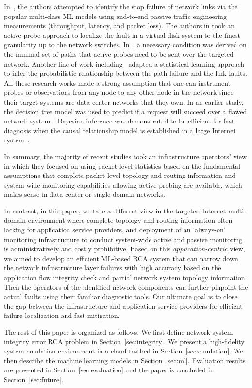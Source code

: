 In~\cite{Link-JIoT-2019}, the authors attempted to identify the stop failure of network links via the popular multi-class ML models using end-to-end passive traffic engineering measurements (throughput, latency, and packet loss). The authors in \cite{DeepView:NSDI18} took an active probe approach to localize the fault in a virtual disk system to the finest granularity up to the network switches. In~\cite{netbouncer:nsdi18}, a necessary condition was derived on the minimal set of paths that active probes need to be sent over the targeted network. Another line of work including~\cite{NetPoirot:Sigcomm2016,KDD14} adapted a statistical learning approach to infer the probabilistic relationship between the path failure and the link faults. All these research works made a strong assumption that one can instrument probes or observations from any node to any other node in the network since their target systems are data center networks that they own. In an earlier study, the decision tree model was used to predict if a request will succeed over a flawed network system~\cite{DT:2004}. Bayesian inference was demonstrated to be efficient for fast diagnosis when the causal relationship model is established in a large Internet system~\cite{BN-Internet:2007}.

In summary, the majority of recent studies took an infrastructure operators' view in which they focused on using packet-level statistics based on the fundamental assumptions that complete packet level topology and routing information 
and system-wide monitoring capabilities allowing active probing are available, which makes sense in data center or single domain networks.  

In contrast, in this paper, we take a different view in the targeted Internet multi-domain environment where complete topology and routing information often lacking for application service providers, and deployment of an 'always-on' monitoring infrastructure to conduct system-wide active and passive monitoring is administratively and costly prohibitive. Based on this {\it application-centric} view, we aimed to develop an efficient ML-based RCA system that can narrow down the network infrastructure layer failures with high accuracy based on the application flow integrity check and partial network system topology information. Then the operators of the identified network components can further pinpoint the actual faults using their familiar diagnostic tools. Our ultimate goal is to close the gap between the infrastructure and application service providers for efficient failure localization and fast mitigation.   

The rest of this paper is organized as follows. We first define network system integrity error RCA problem in Section~\ref{sec:integrity}. We present a high-fidelity system emulation environment in a cloud testbed in Section~\ref{sec:emulation}. We then describe the machine learning models in Section~\ref{sec:ml}. Evaluation results are presented in Section~\ref{sec:evaluation} and the paper is concluded in Section~\ref{sec:future}.
